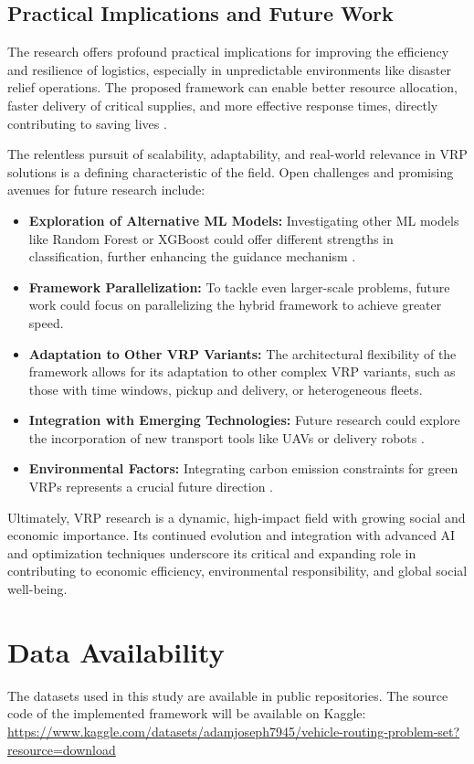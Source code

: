 \documentclass[conference]{IEEEtran} %
\begin{document}
\subsection{Practical Implications and Future Work}
The research offers profound practical implications for improving the efficiency and resilience of logistics, especially in unpredictable environments like disaster relief operations. The proposed framework can enable better resource allocation, faster delivery of critical supplies, and more effective response times, directly contributing to saving lives \cite{yu2020multi}.

The relentless pursuit of scalability, adaptability, and real-world relevance in VRP solutions is a defining characteristic of the field. Open challenges and promising avenues for future research include:
\begin{itemize}
    \item \textbf{Exploration of Alternative ML Models:} Investigating other ML models like Random Forest or XGBoost could offer different strengths in classification, further enhancing the guidance mechanism \cite{calvet2017learnheuristics}.
    \item \textbf{Framework Parallelization:} To tackle even larger-scale problems, future work could focus on parallelizing the hybrid framework to achieve greater speed.
    \item \textbf{Adaptation to Other VRP Variants:} The architectural flexibility of the framework allows for its adaptation to other complex VRP variants, such as those with time windows, pickup and delivery, or heterogeneous fleets.
    \item \textbf{Integration with Emerging Technologies:} Future research could explore the incorporation of new transport tools like UAVs or delivery robots \cite{prins2009multi}.
    \item \textbf{Environmental Factors:} Integrating carbon emission constraints for green VRPs represents a crucial future direction \cite{potvin1995genetic}.
\end{itemize}
Ultimately, VRP research is a dynamic, high-impact field with growing social and economic importance. Its continued evolution and integration with advanced AI and optimization techniques underscore its critical and expanding role in contributing to economic efficiency, environmental responsibility, and global social well-being.

\section*{Data Availability}
The datasets used in this study are available in public repositories. The source code of the implemented framework will be available on Kaggle: \url{https://www.kaggle.com/datasets/adamjoseph7945/vehicle-routing-problem-set?resource=download}
\end{document}
